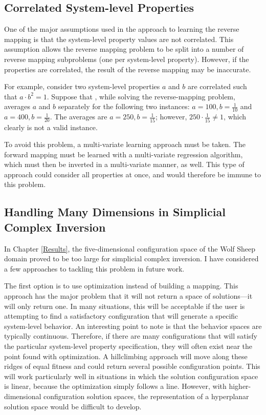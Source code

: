 \subsection{Correlated System-level Properties}

One of the major assumptions used in the \fw approach to learning the reverse mapping is that the system-level property values are not correlated.
This assumption allows the reverse mapping problem to be split into a number of reverse mapping subproblems (one per system-level property).
However, if the properties are correlated, the result of the reverse mapping may be inaccurate.

For example, consider two system-level properties $a$ and $b$ are correlated such that $a \cdot b^2 = 1$.
Suppose that \fw, while solving the reverse-mapping problem, averages $a$ and $b$ separately for the following two instances: $a=100, b=\frac{1}{10}$ and $a=400, b=\frac{1}{20}$.
The averages are $a=250, b=\frac{1}{15}$; however, $250 \cdot \frac{1}{15} \neq 1$, which clearly is not a valid instance.

To avoid this problem, a multi-variate learning approach must be taken.
The forward mapping must be learned with a multi-variate regression algorithm, which must then be inverted in a multi-variate manner, as well.
This type of approach could consider all properties at once, and would therefore be immune to this problem.



\subsection{Handling Many Dimensions in Simplicial Complex Inversion}\label{curseofdim}

In Chapter \ref{Results}, the five-dimensional configuration space of the Wolf Sheep domain proved to be too large for simplicial complex inversion.
I have considered a few approaches to tackling this problem in future work.

The first option is to use optimization instead of building a mapping.
This approach has the major problem that it will not return a space of solutions---it will only return one.
In many situations, this will be acceptable if the user is attempting to find a satisfactory configuration that will generate a specific system-level behavior.
An interesting point to note is that the behavior spaces are typically continuous.
Therefore, if there are many configurations that will satisfy the particular system-level property specification, they will often exist near the point found with optimization.
A hillclimbing approach will move along these ridges of equal fitness and could return several possible configuration points.
This will work particularly well in situations in which the solution configuration space is linear, because the optimization simply follows a line.
However, with higher-dimensional configuration solution spaces, the representation of a hyperplanar solution space would be difficult to develop. 

